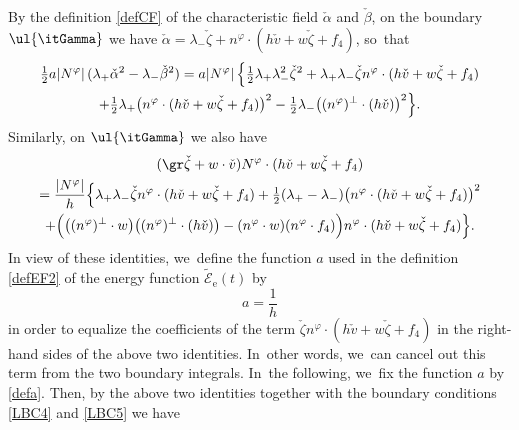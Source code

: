 By the definition \eqref{defCF} of the characteristic field $\check{\alpha}$ and $\check{\beta}$, on the boundary $\ul{\itGamma}$ we have
$\check{\alpha}=\lambda_-\check{\zeta}+n^\varphi\cdot(h\check{v}+w\check{\zeta}+f_4)$, so~that
\begin{multline*}
\tfrac12a|N^\varphi|\,(\lambda_+\check{\alpha}^2-\lambda_-\check{\beta}^2)
= a|N^\varphi|\,\Bigl\{ \tfrac12\lambda_+\lambda_-^2\check{\zeta}^2 + \lambda_+\lambda_-\check{\zeta}n^\varphi\cdot(h\check{v}+w\check{\zeta}+f_4) \\
+ \tfrac12\lambda_+ \bigl(n^\varphi\cdot(h\check{v}+w\check{\zeta}+f_4) \bigr)^2 - \tfrac12\lambda_-\bigl((n^\varphi)^\perp\cdot(h\check{v}) \bigr)^2 \Bigr\}.
\end{multline*}
Similarly, on $\ul{\itGamma}$ we also have\enlargethispage{-2\baselineskip}
\begin{multline*}
(\gr\check{\zeta}+w\cdot\check{v})N^\varphi\cdot(h\check{v}+w\check{\zeta}+f_4) \\
= \dfrac{|N^\varphi|}{h}\Bigl\{ \lambda_+\lambda_-\check{\zeta}n^\varphi\cdot(h\check{v}+w\check{\zeta}+f_4)
+ \tfrac12(\lambda_+-\lambda_-) \bigl(n^\varphi\cdot(h\check{v}+w\check{\zeta}+f_4) \bigr)^2 \\
+ \Bigl(\bigl((n^\varphi)^\perp\cdot w \bigr) \bigl((n^\varphi)^\perp\cdot(h\check{v}) \bigr)-(n^\varphi\cdot w)(n^\varphi\cdot f_4) \Bigr)
n^\varphi\cdot(h\check{v}+w\check{\zeta}+f_4) \Bigr\}.
\end{multline*}
In view of these identities, we~define the function $a$ used in the definition \eqref{defEF2} of the energy function $\widetilde{\mathscr{E}}_\mathrm{e}(t)$ by
\begin{equation}\label{defa}
a=\frac{1}{h}
\end{equation}
in order to equalize the coefficients of the term $\check{\zeta}n^\varphi\cdot(h\check{v}+w\check{\zeta}+f_4)$ in the right-hand sides of the above two identities. In~other words, we~can cancel out this term from the two boundary integrals. In~the following, we~fix the function $a$ by \eqref{defa}.
Then, by the above two identities together with the boundary conditions \eqref{LBC4} and \eqref{LBC5} we have
